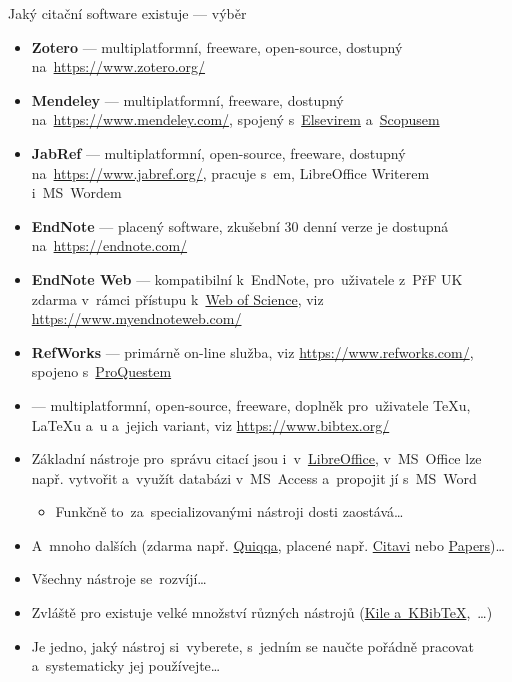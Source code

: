 \documentclass[compress, xelatex, 11pt, xcolor=svgnames, aspectratio=169,
	hyperref={
		bookmarks=true,
		unicode=true,
		colorlinks=true,
		pdftitle={Citacni software},
		plainpages=false,
		pdfauthor={Vojtech Zeisek},
		pdfsubject={Kratky uvod do citacniho software},
		pdfcreator={XeLaTeX},
		pdfkeywords={citace, reference, software, literatura},
		linkcolor=Crimson, %
		anchorcolor=Magenta, %
		citecolor=Magenta, %
		filecolor=Magenta, %
		menucolor=Magenta, %
		urlcolor=DarkTurquoise, %
		},
	url={hyphens, lowtilde} %
	]{beamer}
\begin{document}
\begin{frame}[allowframebreaks]{Jaký citační software existuje --- výběr}
	\begin{itemize}
		\item \textbf{Zotero} --- multiplatformní, freeware, open-source, dostupný na~\url{https://www.zotero.org/}
		\item \textbf{Mendeley} --- multiplatformní, freeware, dostupný na~\url{https://www.mendeley.com/}, spojený s~\href{https://www.elsevier.com/}{Elsevirem}  a~\href{https://www.scopus.com/}{Scopusem}
		\item \textbf{JabRef} --- multiplatformní, open-source, freeware, dostupný na~\url{https://www.jabref.org/}, pracuje s~\BibTeX em, LibreOffice Writerem i~MS~Wordem
		\item \textbf{EndNote} --- placený software, zkušební 30 denní verze je dostupná na~\url{https://endnote.com/}
		\item \textbf{EndNote Web} --- kompatibilní k~EndNote, pro~uživatele z~PřF UK zdarma v~rámci přístupu k~\href{https://www.webofscience.com/}{Web of Science}, viz \url{https://www.myendnoteweb.com/}
		\item \textbf{RefWorks} --- primárně on-line služba, viz \url{https://www.refworks.com/}, spojeno s~\href{https://www.proquest.com/}{ProQuestem}
		\item \textbf{\BibTeX} --- multiplatformní, open-source, freeware, doplněk pro~uživatele \TeX u, \LaTeX u a~\XeLaTeX u a~jejich variant, viz \url{https://www.bibtex.org/}
		\item Základní nástroje pro~správu citací jsou i~v~\href{https://www.openoffice.cz/navody/jak-vytvorit-a-upravovat-seznam-pouzite-literatury}{LibreOffice}, v~MS~Office lze např. vytvořit a~využít databázi v~MS~Access a~propojit jí s~MS~Word
		\begin{itemize}
			\item Funkčně to~za~specializovanými nástroji dosti zaostává\ldots
		\end{itemize}
		\item A~mnoho dalších (zdarma např. \href{https://github.com/jimmejardine/qiqqa-open-source}{Quiqqa}, placené  např. \href{https://www.citavi.com/en}{Citavi} nebo \href{https://www.papersapp.com/}{Papers})\ldots
		\item Všechny nástroje se~rozvíjí\ldots
		\item Zvláště pro \BibTeX{ }existuje velké množství různých nástrojů (\href{https://www.linuxexpres.cz/software/kile-a-kbibtex}{Kile a~KBibTeX},~\ldots)
		\item Je jedno, jaký nástroj si~vyberete, s~jedním se naučte pořádně pracovat a~systematicky jej používejte\ldots
	\end{itemize}
\end{frame}
\end{document}
